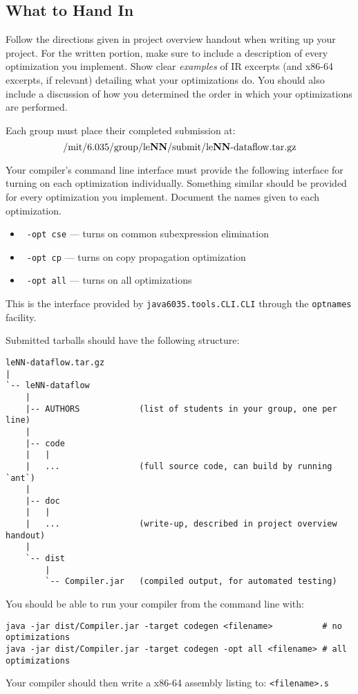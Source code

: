 \subsection*{What to Hand In}

Follow the directions given in project overview handout when writing up
your project.  For the written portion, make sure to include a description of
every optimization you implement.  Show clear {\em examples} of IR excerpts
(and x86-64 excerpts, if relevant) detailing what your optimizations do.
You should also include a discussion of how you determined the order in
which your optimizations are performed.

Each group must place their completed submission at:\[
\mbox{/mit/6.035/group/le{\bf NN}/submit/le{\bf NN}-dataflow.tar.gz}
\]

Your compiler's command line interface must provide the following
interface for turning on each optimization individually.  Something
similar should be provided for every optimization you implement.
Document the names given to each optimization.
\begin{itemize}
\item ~{\tt -opt cse} --- turns on common subexpression elimination
\item ~{\tt -opt cp} --- turns on copy propagation optimization
\item ~{\tt -opt all} --- turns on all optimizations
\end{itemize}
\vspace{-0.1in} This is the interface provided by {\tt java6035.tools.CLI.CLI}
through the {\tt optnames} facility.

Submitted tarballs should have the following structure:
{\scriptsize
\begin{verbatim}
leNN-dataflow.tar.gz
|
`-- leNN-dataflow
    |
    |-- AUTHORS            (list of students in your group, one per line)
    |
    |-- code
    |   |
    |   ...                (full source code, can build by running `ant`)
    |
    |-- doc 
    |   |
    |   ...                (write-up, described in project overview handout)
    |   
    `-- dist 
        |
        `-- Compiler.jar   (compiled output, for automated testing)
\end{verbatim}
}

You should be able to run your compiler from the command line with:
\begin{verbatim}
java -jar dist/Compiler.jar -target codegen <filename>          # no optimizations
java -jar dist/Compiler.jar -target codegen -opt all <filename> # all optimizations
\end{verbatim}
Your compiler should then write a x86-64 assembly listing to: {\tt <filename>.s}

